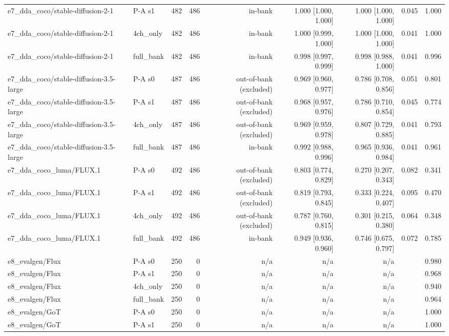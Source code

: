 \begin{table}[htbp]
\begin{tabular}{llrrrrrrr}
e7\_dda\_coco/stable-diffusion-2-1 & P-A s1 & 482 & 486 & in-bank & 1.000 [1.000, 1.000] & 1.000 [1.000, 1.000] & 0.045 & 1.000 \\
e7\_dda\_coco/stable-diffusion-2-1 & 4ch\_only & 482 & 486 & in-bank & 1.000 [0.999, 1.000] & 1.000 [1.000, 1.000] & 0.041 & 1.000 \\
e7\_dda\_coco/stable-diffusion-2-1 & full\_bank & 482 & 486 & in-bank & 0.998 [0.997, 0.999] & 0.998 [0.988, 1.000] & 0.041 & 0.996 \\
e7\_dda\_coco/stable-diffusion-3.5-large & P-A s0 & 487 & 486 & out-of-bank (excluded) & 0.969 [0.960, 0.977] & 0.786 [0.708, 0.856] & 0.051 & 0.801 \\
e7\_dda\_coco/stable-diffusion-3.5-large & P-A s1 & 487 & 486 & out-of-bank (excluded) & 0.968 [0.957, 0.976] & 0.786 [0.710, 0.854] & 0.045 & 0.774 \\
e7\_dda\_coco/stable-diffusion-3.5-large & 4ch\_only & 487 & 486 & out-of-bank (excluded) & 0.969 [0.959, 0.978] & 0.807 [0.729, 0.885] & 0.041 & 0.793 \\
e7\_dda\_coco/stable-diffusion-3.5-large & full\_bank & 487 & 486 & in-bank & 0.992 [0.988, 0.996] & 0.965 [0.936, 0.984] & 0.041 & 0.961 \\
e7\_dda\_coco\_luma/FLUX.1 & P-A s0 & 492 & 486 & out-of-bank (excluded) & 0.803 [0.774, 0.829] & 0.270 [0.207, 0.343] & 0.082 & 0.341 \\
e7\_dda\_coco\_luma/FLUX.1 & P-A s1 & 492 & 486 & out-of-bank (excluded) & 0.819 [0.793, 0.845] & 0.333 [0.224, 0.407] & 0.095 & 0.470 \\
e7\_dda\_coco\_luma/FLUX.1 & 4ch\_only & 492 & 486 & out-of-bank (excluded) & 0.787 [0.760, 0.815] & 0.301 [0.215, 0.380] & 0.064 & 0.348 \\
e7\_dda\_coco\_luma/FLUX.1 & full\_bank & 492 & 486 & in-bank & 0.949 [0.936, 0.960] & 0.746 [0.675, 0.797] & 0.072 & 0.785 \\
e8\_evalgen/Flux & P-A s0 & 250 & 0 & n/a & n/a & n/a &  & 0.980 \\
e8\_evalgen/Flux & P-A s1 & 250 & 0 & n/a & n/a & n/a &  & 0.968 \\
e8\_evalgen/Flux & 4ch\_only & 250 & 0 & n/a & n/a & n/a &  & 0.940 \\
e8\_evalgen/Flux & full\_bank & 250 & 0 & n/a & n/a & n/a &  & 0.964 \\
e8\_evalgen/GoT & P-A s0 & 250 & 0 & n/a & n/a & n/a &  & 1.000 \\
e8\_evalgen/GoT & P-A s1 & 250 & 0 & n/a & n/a & n/a &  & 1.000 \\

\end{tabular}
\end{table}
